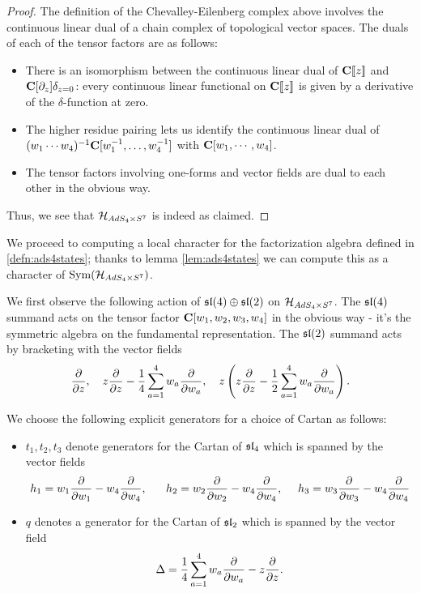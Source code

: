 \documentclass[../main.tex]{subfiles}
\begin{document}
\begin{proof}
The definition of the Chevalley-Eilenberg complex above involves the continuous linear dual of a chain complex of topological vector spaces. The duals of each of the tensor factors are as follows:

\begin{itemize}
\item There is an isomorphism between the continuous linear dual of $\mathbf{C}[\![ z]\!]$ and $\mathbf{C}[\partial_z]\delta_{z=0}$: every continuous linear functional on $\mathbf{C}[\![ z]\!]$ is given by a derivative of the $\delta$-function at zero. 
\item The higher residue pairing lets us identify the continuous linear dual of $(w_1\cdots w_4)^{-1} \mathbf{C}[w_1^{-1},\ldots, w_4^{-1}]$ with $\mathbf{C}[w_1,\cdots, w_4]$.
\item The tensor factors involving one-forms and vector fields are dual to each other in the obvious way.
\end{itemize}

Thus, we see that $\mathcal{H}_{AdS_4\times S^7}$ is indeed as claimed.
\end{proof}

\parsec{}
We proceed to computing a local character for the factorization algebra defined in \ref{defn:ads4states}; thanks to lemma \ref{lem:ads4states} we can compute this as a character of $\text{Sym}(\mathcal{H}_{AdS_4\times S^7})$. 

We first observe the following action of $\mathfrak{sl}(4)\oplus \mathfrak{sl}(2)$ on $\mathcal{H}_{AdS_4\times S^7}$. The $\mathfrak{sl}(4)$ summand acts on the tensor factor $\mathbf{C}[w_1,w_2,w_3,w_4]$ in the obvious way - it's the symmetric algebra on the fundamental representation. The $\mathfrak{sl}(2)$ summand acts by bracketing with the vector fields 
\[
\frac{\partial}{\partial z} ,\quad z \frac{\partial}{\partial z} - \frac14 \sum_{a=1}^4 w_a \frac{\partial}{\partial w_a} , \quad z \left(z \frac{\partial}{\partial z} - \frac12 \sum_{a=1}^4 w_a \frac{\partial}{\partial w_a} \right).
\]

We choose the following explicit generators for a choice of Cartan as follows:
\begin{itemize}
\item $t_1, t_2, t_3$ denote generators for the Cartan of $\mathfrak{sl}_4$ which is spanned by the vector fields \[h_1 = w_1\frac{\partial}{\partial w_1}- w_4\frac{\partial}{\partial w_4}, \ \ \ \ \ h_2 = w_2\frac{\partial}{\partial w_2}- w_4\frac{\partial}{\partial w_4}, \ \ \ \ h_3 = w_3\frac{\partial}{\partial w_3}- w_4\frac{\partial}{\partial w_4}\]
\item $q$ denotes a generator for the Cartan of $\mathfrak{sl}_2$ which is spanned by the vector field \[\Delta = \frac14\sum_{a=1}^4 w_a \frac{\partial }{\partial w_a}-z\frac{\partial}{\partial z}.\]
\end{itemize}
\end{document}
